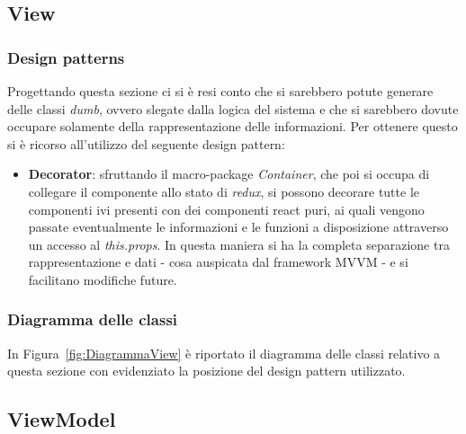 	\subsection{View}
		\subsubsection{Design patterns}
		Progettando questa sezione ci si è resi conto che si sarebbero potute generare delle classi \emph{dumb}, ovvero slegate dalla logica del sistema e che si sarebbero dovute occupare solamente della rappresentazione delle informazioni. Per ottenere questo si è ricorso all'utilizzo del seguente design pattern:
			\begin{itemize}
				\item \textbf{Decorator}: sfruttando il macro-package \emph{Container}, che poi si occupa di collegare il componente allo stato di \emph{redux}, si possono decorare tutte le componenti ivi presenti con dei componenti react puri, ai quali vengono passate eventualmente le informazioni e le funzioni a disposizione attraverso un accesso al \emph{this.props}. In questa maniera si ha la completa separazione tra rappresentazione e dati - cosa auspicata dal framework MVVM - e si facilitano modifiche future.
			\end{itemize}
		
		\subsubsection{Diagramma delle classi}
		In Figura~\ref{fig:DiagrammaView} è riportato il diagramma delle classi relativo a questa sezione con evidenziato la posizione del design pattern utilizzato.
	

	
	\subsection{ViewModel}
